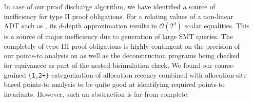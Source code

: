 In case of our proof discharge algorithm, we have identified a source of inefficiency for type II
proof obligations.
For a \recursiveRelation{} relating values of a non-linear ADT such as ,
its $d$-depth approximation results in $\mathcal{O}(2^d)$ scalar equalities.
This is a source of major inefficiency due to generation of large SMT queries.
The completely of type III proof obligations is highly contingent on the precision
of our points-to analysis on \cprog{} as well as the deconstruction programs being
checked for equivanece as part of the nested bisimulation check.
We found our coarse-grained {\tt \{1,2+\}} categorization of allocation recency
combined with allocation-site based points-to analysis to be quite good at
identifying required points-to invariants.
However, such an abstraction is far from complete.